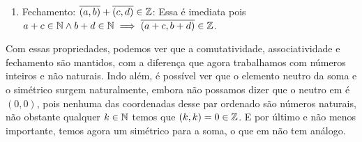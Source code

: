 \documentclass[../main.tex]{subfiles}
\begin{document}
\begin{dem}
\begin{enumerate}[label=(\roman*)]
        \item Fechamento: $\overline{(a,b)} + \overline{(c,d)} \in \mathbb{Z}$:
        Essa é imediata pois $a+c \in \mathbb{N} \land b+d \in \mathbb{N} \implies \overline{(a+c,b+d)} \in \mathbb{Z}$.
    \end{enumerate}
\end{dem}

Com essas propriedades, podemos ver que a comutatividade, associatividade e fechamento são mantidos, com a diferença que agora trabalhamos com números inteiros e não naturais. Indo além, é possível ver que o elemento neutro da soma e o simétrico surgem naturalmente, embora não possamos dizer que o neutro em \Z é $(0,0)$, pois nenhuma das coordenadas desse par ordenado são números naturais, não obstante qualquer $k \in \mathbb{N}$ temos que $(k,k) = 0 \in \mathbb{Z}$. E por último e não menos importante, temos agora um simétrico para a soma, o que em \N não tem análogo.
\end{document}
